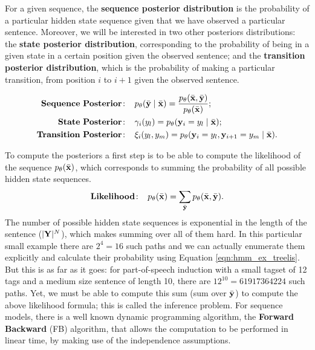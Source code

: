 For a given sequence, the \textbf{sequence posterior distribution} is the probability of a particular
hidden state sequence given that we have observed a particular
sentence. Moreover, we will be interested in two other posteriors distributions:
the \textbf{state posterior distribution}, corresponding to the
probability of being in a given state in a certain position given the
observed sentence; and the \textbf{transition posterior distribution},
which is the probability of making a particular transition, from position $i$ to
$i+1$ given the observed sentence. 

\begin{align}
  \mathbf{Sequence \ Posterior\!:}\;\;\;\; &p_{\theta}(\bar{\mathbf{y}} \mid \bar{\mathbf{x}}) = \frac{p_{\theta}(\bar{\mathbf{x}} ,\bar{\mathbf{y}})}{p_{\theta}(\bar{\mathbf{x}})}; \label{eq::posteriorDistribution} \\
 \mathbf{State \ Posterior\!:}\;\;\;\;  & \gamma_i({y}_l) = p_\theta(\mathbf{y}_i = {y}_l \mid \bar{\mathbf{x}}); \label{eq::nodePosterior} \\
 \mathbf{Transition \ Posterior\!:}\;\;\;\;  &\xi_i({y}_l,{y}_m) = p_\theta(\mathbf{y}_i = {y}_l, \mathbf{y}_{i+1}= {y}_m  \mid \bar{\mathbf{x}}).\label{eq::edgePosterior}
\end{align}

To compute the posteriors a first step is to be able to compute the 
likelihood of
the sequence $p_{\theta}(\bar{\mathbf{x}})$, which corresponds to summing the probability of all
possible hidden state sequences.
\begin{equation}
\label{likelihoood}
\mathbf{Likelihood\!:}\;\;\;\; p_{\theta}(\bar{\mathbf{x}}) = \displaystyle \sum_{\bar{\mathbf{y}}} p_{\theta}(\bar{\mathbf{x}} ,\bar{\mathbf{y}}).
\end{equation}
The number of possible hidden state sequences is exponential in the
length of the sentence ($|\mathbf{Y}|^N$),
 which makes summing over all of them hard. In this particular small
 example there are $2^4 = 16$ such paths and we can actually enumerate
 them explicitly and calculate their probability using Equation \ref{eqn:hmm_ex_treelis}. But this is as far as it goes: for part-of-speech
 induction with a small tagset of 12 tags and a medium size
 sentence of length 10, there are $12^{10} = 61 917 364 224$ such
 paths. 
Yet, we must be able to compute this sum (sum over $\bar{\mathbf{y}}$) to compute the above likelihood
formula; this is called the inference problem. For sequence models, there is a well known dynamic programming algorithm,
the \textbf{Forward Backward} (FB) algorithm, that allows the computation
to be performed in linear time, by making use of the independence assumptions.

